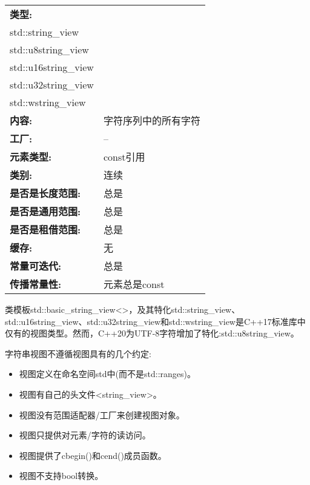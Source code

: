 \begin{longtable}[c]{|l|l|}
\hline
\textbf{类型:} &
\begin{tabular}[c]{@{}l@{}}std::basic\_string\_view\textless{}\textgreater\\ std::string\_view\\ std::u8string\_view\\ std::u16string\_view\\ std::u32string\_view\\ std::wstring\_view\end{tabular} \\ \hline
\endfirsthead
%
\endhead
%
\textbf{内容:}              & 字符序列中的所有字符 \\ \hline
\textbf{工厂:}              & --                                     \\ \hline
\textbf{元素类型:}         & const引用                       \\ \hline
\textbf{类别:}             & 连续                             \\ \hline
\textbf{是否是长度范围:}       & 总是                                 \\ \hline
\textbf{是否是通用范围:}      & 总是                                 \\ \hline
\textbf{是否是租借范围:}    & 总是                                 \\ \hline
\textbf{缓存:}               & 无                                \\ \hline
\textbf{常量可迭代:}       & 总是                                 \\ \hline
\textbf{传播常量性:} & 元素总是const              \\ \hline
\end{longtable}

类模板std::basic\_string\_view<>，及其特化std::string\_view、std::u16string\_view、std::u32string\_view和std::wstring\_view是C++17标准库中仅有的视图类型。然而，C++20为UTF-8字符增加了特化:std::u8string\_view。

字符串视图不遵循视图具有的几个约定:

\begin{itemize}
\item
视图定义在命名空间std中(而不是std::ranges)。

\item
视图有自己的头文件<string\_view>。

\item
视图没有范围适配器/工厂来创建视图对象。

\item
视图只提供对元素/字符的读访问。

\item
视图提供了cbegin()和cend()成员函数。

\item
视图不支持bool转换。
\end{itemize}

